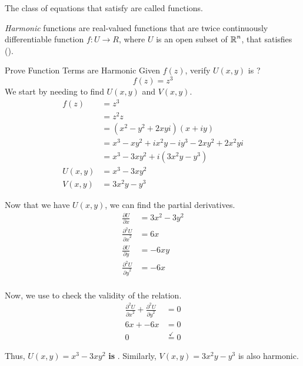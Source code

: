 The class of equations that satisfy  are called  functions.

\begin{definition}[Harmonic]\label{def:Harmonic}
  \emph{Harmonic} functions are real-valued functions that are twice continuously differentiable function $f: U \to R$, where $U$ is an open subset of $\operatorname{\mathbb{R}}^{n}$, that satisfies~ ().
\end{definition}

\begin{example}[Lecture 5]{Prove Function Terms are Harmonic}
  Given $f(z)$, verify $U(x, y)$ is ?
  \begin{equation*}
    f(z) = z^{3}
  \end{equation*}
  \tcblower{}
  We start by needing to find $U(x, y)$ and $V(x, y)$.
  \begin{align*}
    f(z) &= z^{3} \\
         &= z^{2} z \\
         &= \left( x^{2} - y^{2} + 2xyi \right) (x + iy) \\
         &= x^{3} - xy^{2} + ix^{2}y - iy^{3} - 2xy^{2} + 2x^{2}yi \\
         &= x^{3} - 3xy^{2} + i \left( 3x^{2}y - y^{3} \right) \\
    U(x, y) &= x^{3} - 3xy^{2} \\
    V(x, y) &= 3x^{2}y - y^{3}
  \end{align*}

  Now that we have $U(x, y)$, we can find the partial derivatives.
  \begin{align*}
    \frac{\partial U}{\partial x} &= 3x^{2} - 3y^{2} \\
    \frac{\partial^{2} U}{{\partial x}^{2}} &= 6x \\
    \frac{\partial U}{\partial y} &= -6xy \\
    \frac{\partial^{2} U}{{\partial y}^{2}} &= -6x \\
  \end{align*}

  Now, we use  to check the validity of the  relation.
  \begin{align*}
    \frac{\partial^{2} U}{{\partial x}^{2}} + \frac{\partial^{2} U}{{\partial y}^{2}} &= 0 \\
    6x + -6x &= 0 \\
    0 &\overset{\checkmark}{=} 0
  \end{align*}

  Thus, $U(x, y) = x^{3} - 3xy^{2}$ \textbf{is} .
  Similarly, $V(x, y) = 3x^{2}y - y^{3}$ is also harmonic.
\end{example}
